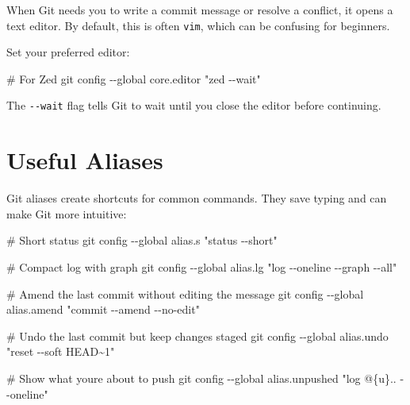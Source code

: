 \documentclass[
  letterpaper,
  DIV=11,
  numbers=noendperiod]{scrreprt}
\newenvironment{Shaded}{\begin{snugshade}}{\end{snugshade}}
\newcommand{\AttributeTok}[1]{\textcolor[rgb]{0.40,0.45,0.13}{#1}}
\newcommand{\CommentTok}[1]{\textcolor[rgb]{0.37,0.37,0.37}{#1}}
\newcommand{\FunctionTok}[1]{\textcolor[rgb]{0.28,0.35,0.67}{#1}}
\newcommand{\NormalTok}[1]{\textcolor[rgb]{0.00,0.23,0.31}{#1}}
\newcommand{\StringTok}[1]{\textcolor[rgb]{0.13,0.47,0.30}{#1}}
\begin{document}
When Git needs you to write a commit message or resolve a conflict, it
opens a text editor. By default, this is often \texttt{vim}, which can
be confusing for beginners.

Set your preferred editor:

\begin{codelisting}

\caption{\texttt{terminal}}

\begin{Shaded}
\begin{Highlighting}[]
\CommentTok{\# For Zed}
\FunctionTok{git}\NormalTok{ config }\AttributeTok{{-}{-}global}\NormalTok{ core.editor }\StringTok{"zed {-}{-}wait"}
\end{Highlighting}
\end{Shaded}

\end{codelisting}

The \texttt{-\/-wait} flag tells Git to wait until you close the editor
before continuing.

\section{Useful Aliases}\label{useful-aliases}

Git aliases create shortcuts for common commands. They save typing and
can make Git more intuitive:

\begin{codelisting}

\caption{\texttt{terminal}}

\begin{Shaded}
\begin{Highlighting}[]
\CommentTok{\# Short status}
\FunctionTok{git}\NormalTok{ config }\AttributeTok{{-}{-}global}\NormalTok{ alias.s }\StringTok{"status {-}{-}short"}

\CommentTok{\# Compact log with graph}
\FunctionTok{git}\NormalTok{ config }\AttributeTok{{-}{-}global}\NormalTok{ alias.lg }\StringTok{"log {-}{-}oneline {-}{-}graph {-}{-}all"}

\CommentTok{\# Amend the last commit without editing the message}
\FunctionTok{git}\NormalTok{ config }\AttributeTok{{-}{-}global}\NormalTok{ alias.amend }\StringTok{"commit {-}{-}amend {-}{-}no{-}edit"}

\CommentTok{\# Undo the last commit but keep changes staged}
\FunctionTok{git}\NormalTok{ config }\AttributeTok{{-}{-}global}\NormalTok{ alias.undo }\StringTok{"reset {-}{-}soft HEAD\textasciitilde{}1"}

\CommentTok{\# Show what you\textquotesingle{}re about to push}
\FunctionTok{git}\NormalTok{ config }\AttributeTok{{-}{-}global}\NormalTok{ alias.unpushed }\StringTok{"log @\{u\}.. {-}{-}oneline"}
\end{Highlighting}
\end{Shaded}

\end{codelisting}
\end{document}

